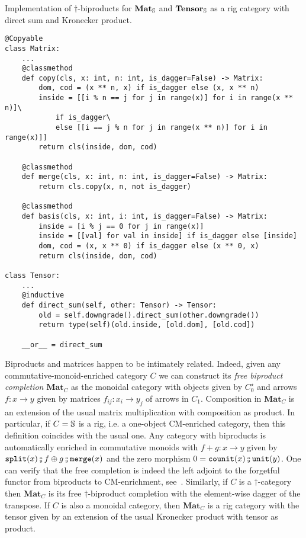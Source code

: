 \begin{python}
{\normalfont Implementation of $\dagger$-biproducts for $\mathbf{Mat}_\S$
and $\mathbf{Tensor}_\S$ as a rig category with direct sum and Kronecker product.}

\begin{verbatim}
@Copyable
class Matrix:
    ...
    @classmethod
    def copy(cls, x: int, n: int, is_dagger=False) -> Matrix:
        dom, cod = (x ** n, x) if is_dagger else (x, x ** n)
        inside = [[i % n == j for j in range(x)] for i in range(x ** n)]\
            if is_dagger\
            else [[i == j % n for j in range(x ** n)] for i in range(x)]]
        return cls(inside, dom, cod)

    @classmethod
    def merge(cls, x: int, n: int, is_dagger=False) -> Matrix:
        return cls.copy(x, n, not is_dagger)

    @classmethod
    def basis(cls, x: int, i: int, is_dagger=False) -> Matrix:
        inside = [i % j == 0 for j in range(x)]
        inside = [[val] for val in inside] if is_dagger else [inside]
        dom, cod = (x, x ** 0) if is_dagger else (x ** 0, x)
        return cls(inside, dom, cod)

class Tensor:
    ...
    @inductive
    def direct_sum(self, other: Tensor) -> Tensor:
        old = self.downgrade().direct_sum(other.downgrade())
        return type(self)(old.inside, [old.dom], [old.cod])

    __or__ = direct_sum
\end{verbatim}
\end{python}

Biproducts and matrices happen to be intimately related.
Indeed, given any commutative-monoid-enriched category $C$ we can construct its \emph{free biproduct completion} $\mathbf{Mat}_C$ as the monoidal category with objects given by $C_0^\star$ and arrows $f : x \to y$ given by matrices $f_{ij} : x_i \to y_j$ of arrows in $C_1$.
Composition in $\mathbf{Mat}_C$ is an extension of the usual matrix multiplication with composition as product.
In particular, if $C = \S$ is a rig, i.e. a one-object CM-enriched category, then this definition coincides with the usual one.
Any category with biproducts is automatically enriched in commutative monoids with $f + g : x \to y$ given by $\ttsplit(x) \fcmp f \oplus g \fcmp \merge(x)$ and the zero morphism $0 = \counit(x) \fcmp \unit(y)$.
One can verify that the free completion is indeed the left adjoint to the forgetful functor from biproducts to CM-enrichment, see~\cite[Exercise VIII.2.6]{MacLane71}.
Similarly, if $C$ is a $\dagger$-category then $\mathbf{Mat}_C$ is its free $\dagger$-biproduct completion with the element-wise dagger of the transpose.
If $C$ is also a monoidal category, then $\mathbf{Mat}_C$ is a rig category with the tensor given by an extension of the usual Kronecker product with tensor as product.

